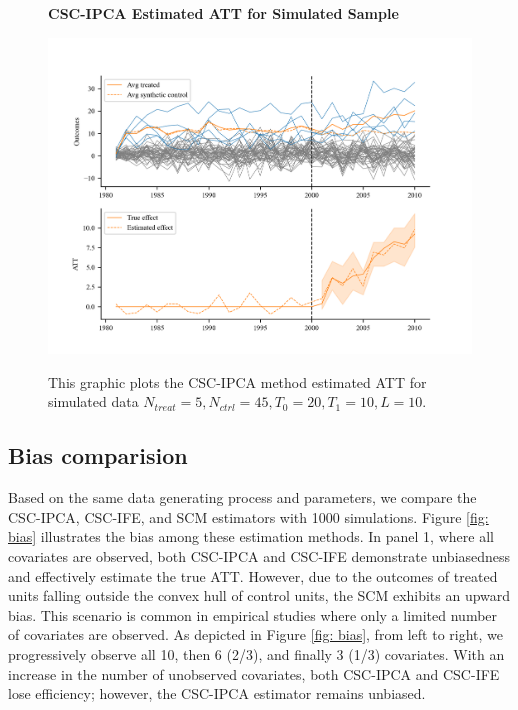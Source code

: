 \documentclass[12pt]{article}
\begin{document}
\begin{figure}[!ht]
    \centering
    \caption{\textbf{CSC-IPCA Estimated ATT for Simulated Sample}}
    \includegraphics{figs/estimation.png}
    \label{fig: est}
    \caption*{\footnotesize{This graphic plots the CSC-IPCA method estimated ATT for simulated data $N_{treat} = 5, N_{ctrl} = 45, T_0=20, T_1=10, L=10$.}}
    \end{figure}

\subsection{Bias comparision}
Based on the same data generating process and parameters, we compare the CSC-IPCA, CSC-IFE, and SCM estimators with 1000 simulations. Figure \ref{fig: bias} illustrates the bias among these estimation methods. In panel 1, where all covariates are observed, both CSC-IPCA and CSC-IFE demonstrate unbiasedness and effectively estimate the true ATT. However, due to the outcomes of treated units falling outside the convex hull of control units, the SCM exhibits an upward bias. This scenario is common in empirical studies where only a limited number of covariates are observed. As depicted in Figure \ref{fig: bias}, from left to right, we progressively observe all 10, then 6 (2/3), and finally 3 (1/3) covariates. With an increase in the number of unobserved covariates, both CSC-IPCA and CSC-IFE lose efficiency; however, the CSC-IPCA estimator remains unbiased.
\end{document}
